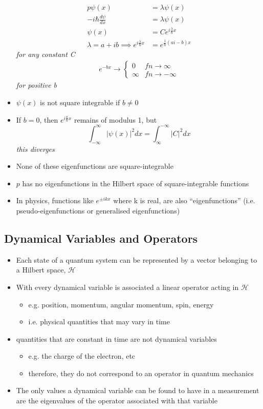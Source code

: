\documentclass[a4paper,11pt,normalem]{article}
\begin{document}
\begin{itemize}
\[\begin{aligned}
    p\psi(x) &= \lambda\psi(x) \\
    -i\hbar\frac{d\psi}{dx} &= \lambda\psi(x) \\
    \psi(x) &= Ce^{i\frac{\lambda}{\hbar}x} \\
    \lambda = a + ib \implies e^{i\frac{\lambda}{\hbar}x} &= e^{\frac{1}{\hbar}(ai - b)x}
    \end{aligned}
\]
\emph{for any constant C}
\[
    \begin{aligned}
    e^{-bx} \to \begin{cases} 0 & fn \to \infty \\ \infty & fn \to -\infty \end{cases}
    \end{aligned}
\]
\emph{for positive b}
\item
  \(\psi(x)\) is not square integrable if \(b \neq 0\)
\item
  If \(b = 0\), then \(e^{i\frac{a}{\hbar}x}\) remains of modulus 1, but
\[
    \int_{-\infty}^{\infty} |\psi(x)|^2dx = \int^{-\infty}_{\infty} |C|^2dx
\]
\emph{this diverges}
\item
  None of these eigenfunctions are square-integrable
\item
  \(p\) has no eigenfunctions in the Hilbert space of square-integrable
  functions
\item
  In physics, functions like \(e^{\pm ikx}\) where k is real, are also
  ``eigenfunctions'' (i.e. pseudo-eigenfunctions or generalised
  eigenfunctions)
\end{itemize}

\subsection{Dynamical Variables and Operators}\label{dynamical-variables-and-operators}

\begin{itemize}
\item
  Each state of a quantum system can be represented by a vector
  belonging to a Hilbert space, \(\mathcal{H}\)
\item
  With every dynamical variable is associated a linear operator acting
  in \(\mathcal{H}\)
  \begin{itemize}
  \item
    e.g. position, momentum, angular momentum, spin, energy
  \item
    i.e. physical quantities that may vary in time
  \end{itemize}
\item
  quantities that are constant in time are not dynamical variables
  \begin{itemize}
  \item
    e.g. the charge of the electron, etc
  \item
    therefore, they do not correspond to an operator in quantum
    mechanics
  \end{itemize}
\item
  The only values a dynamical variable can be found to have in a
  measurement are the eigenvalues of the operator associated with that
  variable
\end{itemize}
\end{document}
